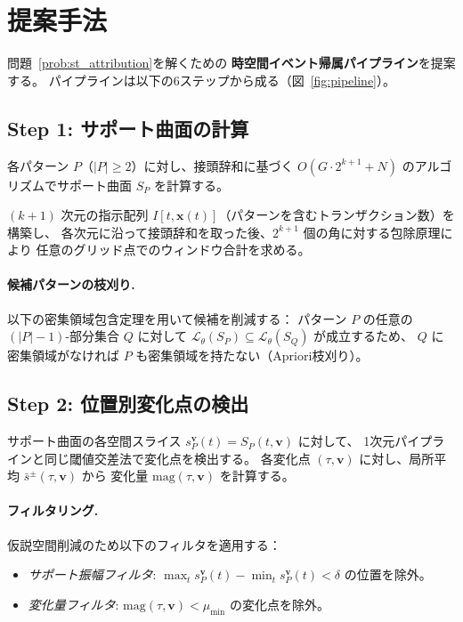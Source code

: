 \section{提案手法}\label{sec:method}

問題~\ref{prob:st_attribution}を解くための
\textbf{時空間イベント帰属パイプライン}を提案する。
パイプラインは以下の6ステップから成る（図~\ref{fig:pipeline}）。



\subsection{Step 1: サポート曲面の計算}

各パターン $P$（$|P| \geq 2$）に対し、接頭辞和に基づく
$O(G \cdot 2^{k+1} + N)$ のアルゴリズムでサポート曲面 $S_P$ を計算する。

$(k{+}1)$ 次元の指示配列 $I[t, \mathbf{x}(t)]$（パターンを含むトランザクション数）を構築し、
各次元に沿って接頭辞和を取った後、$2^{k+1}$ 個の角に対する包除原理により
任意のグリッド点でのウィンドウ合計を求める。

\paragraph{候補パターンの枝刈り.}
以下の密集領域包含定理を用いて候補を削減する：
パターン $P$ の任意の $(|P|-1)$-部分集合 $Q$ に対して
$\mathcal{L}_\theta(S_P) \subseteq \mathcal{L}_\theta(S_Q)$ が成立するため、
$Q$ に密集領域がなければ $P$ も密集領域を持たない（Apriori枝刈り）。

\subsection{Step 2: 位置別変化点の検出}

サポート曲面の各空間スライス $s_P^{\mathbf{v}}(t) = S_P(t, \mathbf{v})$ に対して、
1次元パイプラインと同じ閾値交差法で変化点を検出する。
各変化点 $(\tau, \mathbf{v})$ に対し、局所平均 $\bar{s}^{\pm}(\tau, \mathbf{v})$ から
変化量 $\mathrm{mag}(\tau, \mathbf{v})$ を計算する。

\paragraph{フィルタリング.}
仮説空間削減のため以下のフィルタを適用する：
\begin{itemize}
\item \emph{サポート振幅フィルタ}: $\max_t s_P^{\mathbf{v}}(t) - \min_t s_P^{\mathbf{v}}(t) < \delta$ の位置を除外。
\item \emph{変化量フィルタ}: $\mathrm{mag}(\tau, \mathbf{v}) < \mu_{\min}$ の変化点を除外。
\end{itemize}

